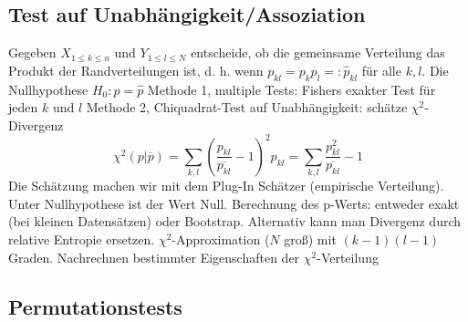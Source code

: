 \subsection{Test auf Unabhängigkeit/Assoziation}
\begin{outline}
\0 Gegeben $X_{1\leq k \leq n}$ und $Y_{1\leq l \leq N}$ entscheide, ob die gemeinsame Verteilung das Produkt der Randverteilungen ist, d. h. wenn $p_{kl}=p_k p_l=:\hat{p}_{kl}$ für alle $k,l$.
    \1 Die Nullhypothese $H_0 : p=\hat{p}$
    \1 Methode 1, multiple Tests: Fishers exakter Test für jeden $k$ und $l$
    \1 Methode 2, Chiquadrat-Test auf Unabhängigkeit: schätze $\chi^2$-Divergenz $$\chi^2(p|\overline{p})=\sum_{k,l}\left(\frac{p_{kl}}{\overline{p_{kl}}}-1\right)^2 p_{kl}=\sum_{k,l}\frac{p_{kl}^2}{\overline{p_{kl}}}-1$$
    Die Schätzung machen wir mit dem Plug-In Schätzer (empirische Verteilung). Unter Nullhypothese ist der Wert Null.
        \2 Berechnung des p-Werts: entweder exakt (bei kleinen Datensätzen) oder Bootstrap. 
        \2 Alternativ kann man Divergenz durch relative Entropie ersetzen.
    \1 $\chi^2$-Approximation ($N$ groß) mit $(k-1)(l-1)$ Graden.
        \2 Nachrechnen bestimmter Eigenschaften der $\chi^2$-Verteilung
\end{outline}

\subsection{Permutationstests}


